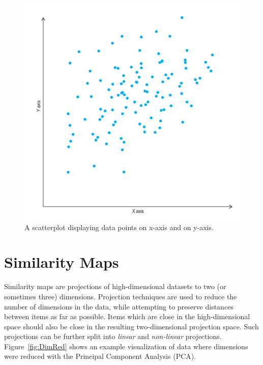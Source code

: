 \begin{figure}[tp]
\centering
\includegraphics[frame,keepaspectratio,width=\linewidth,height=\halfh]
{diagrams/scatterplot.pdf}

\caption[Scatterplot]
{
A scatterplot displaying data points on x-axis and on y-axis.
}
\label{fig:ScatterplotDiagram}
\end{figure}





\section{Similarity Maps}

Similarity maps are projections of high-dimensional datasets to two (or
sometimes three) dimensions. Projection techniques are used to reduce the
number of dimensions in the data, while attempting to preserve distances
between items as far as possible. Items which are close in the
high-dimensional space should also be close in the resulting
two-dimensional projection space. Such projections can be further split
into \emph{linear} and \emph{non-linear} projections.
Figure~\ref{fig:DimRed} shows an example visualization of data where
dimensions were reduced with the Principal Component Analysis (PCA). 

